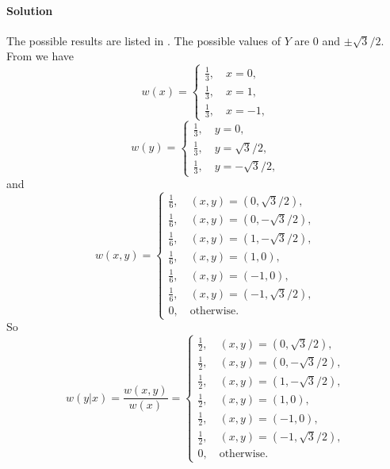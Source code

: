\documentclass[hyperref, a4paper]{article}
\begin{document}
\paragraph{Solution} The possible results are listed in .
The possible values of $Y$ are $0$ and $\pm \sqrt{3}/ 2$.
From  we have
\begin{equation}
    w(x) = \begin{cases}
        \frac{1}{3}, \quad x = 0, \\
        \frac{1}{3}, \quad x = 1, \\
        \frac{1}{3}, \quad x = -1,
    \end{cases}
\end{equation}
\begin{equation}
    w(y) = \begin{cases}
        \frac{1}{3}, \quad y = 0, \\
        \frac{1}{3}, \quad y = \sqrt{3} / 2, \\
        \frac{1}{3}, \quad y = - \sqrt{3} / 2,
    \end{cases}
\end{equation}
and 
\begin{equation}
    w(x , y) = \begin{cases}
        \frac{1}{6}, \quad (x, y) = (0, \sqrt{3} /2), \\
        \frac{1}{6}, \quad (x, y) = (0, - \sqrt{3} / 2), \\
        \frac{1}{6}, \quad (x, y) = (1, - \sqrt{3} / 2), \\
        \frac{1}{6}, \quad (x, y) = (1, 0), \\
        \frac{1}{6}, \quad (x, y) = (-1, 0), \\
        \frac{1}{6}, \quad (x, y) = (-1, \sqrt{3}/2), \\
        0, \quad \text{otherwise}.
    \end{cases}
\end{equation}
So 
\begin{equation}
    w(y | x) = \frac{w(x, y)}{w(x)} = 
    \begin{cases}
        \frac{1}{2}, \quad (x, y) = (0, \sqrt{3} /2), \\
        \frac{1}{2}, \quad (x, y) = (0, - \sqrt{3} / 2), \\
        \frac{1}{2}, \quad (x, y) = (1, - \sqrt{3} / 2), \\
        \frac{1}{2}, \quad (x, y) = (1, 0), \\
        \frac{1}{2}, \quad (x, y) = (-1, 0), \\
        \frac{1}{2}, \quad (x, y) = (-1, \sqrt{3}/2), \\
        0, \quad \text{otherwise}.
    \end{cases}
\end{equation}
\end{document}
